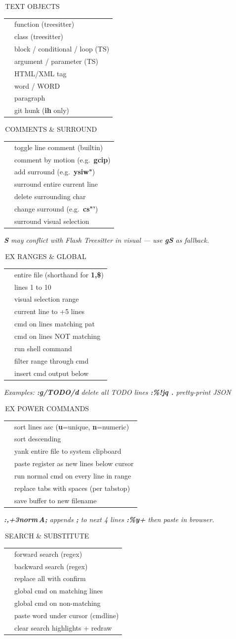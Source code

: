 \documentclass[9pt,a4paper,landscape]{extarticle}
\makeatletter
\newcommand{\kbd}[1]{{\ttfamily\bfseries\footnotesize\color{keyclr}#1}}
\newcommand{\sect}[1]{%
  \vspace{0.5pt}%
  {\setlength{\fboxsep}{1pt}%
   \noindent\colorbox{hdrbg}{\parbox{\dimexpr\columnwidth-2pt\relax}{%
     \color{hdrfg}\bfseries\sffamily\small\strut\,#1}}}%
  \par\vspace{0pt}}
\newlength{\kdsep}\setlength{\kdsep}{0pt}
\newcommand{\kd}[2]{\kbd{#1} & #2 \\[\kdsep]}
\newenvironment{kt}{%
  \setlength{\tabcolsep}{0pt}%
  \begin{tabular}{@{}>{\footnotesize\raggedright\arraybackslash}p{17mm}@{\hspace{2pt}}>{\footnotesize\color{bodyclr}\raggedright\arraybackslash}p{\dimexpr\columnwidth-17mm-2pt\relax}@{}}%
}{%
  \end{tabular}\par}
\newcommand{\snote}[1]{{\scriptsize\color{noteclr}\textit{#1}}\par}
\makeatother
\begin{document}
\begin{multicols}{5}
\sect{TEXT OBJECTS}
\begin{kt}
\kd{f}{function (treesitter)}
\kd{c}{class (treesitter)}
\kd{o}{block / conditional / loop (TS)}
\kd{a}{argument / parameter (TS)}
\kd{t}{HTML/XML tag}
\kd{w\,/\,W}{word / WORD}
\kd{p}{paragraph}
\kd{h}{git hunk (\kbd{ih} only)}
\end{kt}

\sect{COMMENTS \& SURROUND}
\begin{kt}
\kd{gcc}{toggle line comment (builtin)}
\kd{gc\{m\}}{comment by motion (e.g.\ \kbd{gcip})}
\kd{ys\{m\}\{c\}}{add surround (e.g.\ \kbd{ysiw"})}
\kd{yss\{c\}}{surround entire current line}
\kd{ds\{c\}}{delete surrounding char}
\kd{cs\{o\}\{n\}}{change surround (e.g.\ \kbd{cs"'})}
\kd{S\{c\}}{surround visual selection}
\end{kt}
\snote{\kbd{S} may conflict with Flash Treesitter in visual — use \kbd{gS} as fallback.}

\sect{EX RANGES \& GLOBAL}
\begin{kt}
\kd{:\%}{entire file (shorthand for \kbd{1,\$})}
\kd{:1,10}{lines 1 to 10}
\kd{:'<,'>}{visual selection range}
\kd{:.,.+5}{current line to +5 lines}
\kd{:g/pat/\{cmd\}}{cmd on lines matching pat}
\kd{:v/pat/\{cmd\}}{cmd on lines NOT matching}
\kd{:!\{cmd\}}{run shell command}
\kd{:\{r\}!\{cmd\}}{filter range through cmd}
\kd{:read\,!\{cmd\}}{insert cmd output below}
\end{kt}
\snote{Examples: \kbd{:g/TODO/d} delete all TODO lines \textbullet{} \kbd{:\%!jq .} pretty-print JSON}

\sect{EX POWER COMMANDS}
\begin{kt}
\kd{:sort}{sort lines asc (\kbd{u}=unique, \kbd{n}=numeric)}
\kd{:sort!}{sort descending}
\kd{:\%y+}{yank entire file to system clipboard}
\kd{:put\,\{r\}}{paste register as new lines below cursor}
\kd{:norm\,\{cmd\}}{run normal cmd on every line in range}
\kd{:retab}{replace tabs with spaces (per tabstop)}
\kd{:saveas\,\{f\}}{save buffer to new filename}
\end{kt}
\snote{\kbd{:,+3norm\,A;} appends \kbd{;} to next 4 lines \textbullet{} \kbd{:\%y+} then paste in browser.}

\sect{SEARCH \& SUBSTITUTE}
\begin{kt}
\kd{/\,pat}{forward search (regex)}
\kd{?\,pat}{backward search (regex)}
\kd{:\%s/o/n/gc}{replace all with confirm}
\kd{:g/pat/cmd}{global cmd on matching lines}
\kd{:v/pat/cmd}{global cmd on non-matching}
\kd{C-r\,C-w}{paste word under cursor (cmdline)}
\kd{C-l}{clear search highlights + redraw}
\end{kt}


\end{multicols}
\end{document}
